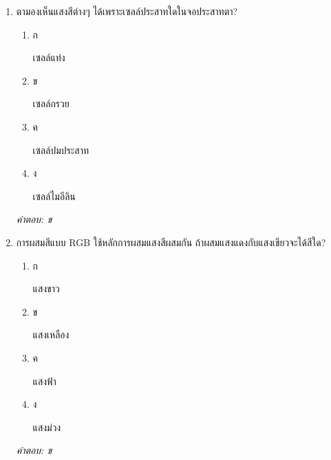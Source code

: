 \documentclass[12pt]{article}
\begin{document}
\begin{enumerate}[label=\arabic*., itemsep=0.5\baselineskip, topsep=0.5\baselineskip, leftmargin=*]
\item ตามองเห็นแสงสีต่างๆ ได้เพราะเซลล์ประสาทใดในจอประสาทตา?
\begin{enumerate}[label=\alph*)., itemsep=0.3\baselineskip, topsep=0.3\baselineskip]
\item ก\ 
\begin{minipage}[t]{0.9\linewidth}
\raggedright เซลล์แท่ง
\end{minipage}
\item ข\ 
\begin{minipage}[t]{0.9\linewidth}
\raggedright เซลล์กรวย
\end{minipage}
\item ค\ 
\begin{minipage}[t]{0.9\linewidth}
\raggedright เซลล์ปมประสาท
\end{minipage}
\item ง\ 
\begin{minipage}[t]{0.9\linewidth}
\raggedright เซลล์ไมอีลิน
\end{minipage}
\end{enumerate}
\vspace{-0.3\baselineskip}
\begin{small}
\textit{คำตอบ: ข}
\end{small}

\item การผสมสีแบบ RGB ใช้หลักการผสมแสงสีผสมกัน ถ้าผสมแสงแดงกับแสงเขียวจะได้สีใด?
\begin{enumerate}[label=\alph*)., itemsep=0.3\baselineskip, topsep=0.3\baselineskip]
\item ก\ 
\begin{minipage}[t]{0.9\linewidth}
\raggedright แสงขาว
\end{minipage}
\item ข\ 
\begin{minipage}[t]{0.9\linewidth}
\raggedright แสงเหลือง
\end{minipage}
\item ค\ 
\begin{minipage}[t]{0.9\linewidth}
\raggedright แสงฟ้า
\end{minipage}
\item ง\ 
\begin{minipage}[t]{0.9\linewidth}
\raggedright แสงม่วง
\end{minipage}
\end{enumerate}
\vspace{-0.3\baselineskip}
\begin{small}
\textit{คำตอบ: ข}
\end{small}


\end{enumerate}
\end{document}
